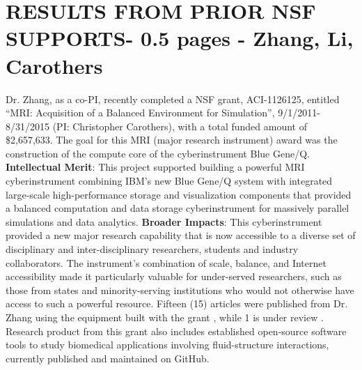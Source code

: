 \documentclass[12pt]{article}
\begin{document}
\section{RESULTS FROM PRIOR NSF SUPPORTS- 0.5 pages - Zhang, Li, Carothers}

Dr. Zhang, as a co-PI, recently completed a NSF grant, ACI-1126125, entitled ``MRI: Acquisition of a Balanced Environment for Simulation'', 9/1/2011-8/31/2015 (PI: Christopher Carothers), with a total funded amount of \$2,657,633. 
The goal for this MRI (major research instrument) award was the construction of the compute core of the cyberinstrument Blue Gene/Q. 
%
\textbf{Intellectual Merit}: This project supported building a powerful MRI cyberinstrument combining IBM's new Blue Gene/Q system with integrated large-scale high-performance storage and visualization components 
that provided 
a balanced computation and data storage cyberinstrument for massively parallel simulations and data analytics. 
%
%
\textbf{Broader Impacts}: This cyberinstrument provided a new major research capability that is now accessible to a diverse set of disciplinary and inter-disciplinary researchers, students and industry collaborators. The instrument's combination of scale, balance, and Internet accessibility made it particularly valuable for under-served researchers, such as those from states and minority-serving institutions who would not otherwise have access to such a powerful resource.
%
Fifteen (15)  articles were published from Dr. Zhang using the equipment built with the grant \cite{li-particletransport-2015,cwang2013,wang-zhang-mifem,zhang2013,zhang2014,chuwang2015,wang2012semi,wang2013modified,zhang2013advancements,yong-2013-jcp,yong2013,yong-slip2013,chuwang2014,zhang2014modeling,yang2016VFdraft}, while 1 is under review \cite{yang2016PMLdraft}. Research product from this grant also includes established open-source software tools to study biomedical applications involving fluid-structure interactions, currently published and maintained on GitHub. 

\clearpage

%
\clearpage
{}


\end{document}
